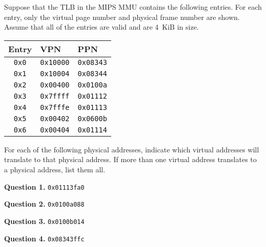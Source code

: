 \documentclass[letterpaper,twocolumn,10pt]{article}
\begin{document}
\pagestyle{fancy}
\fancyfoot[C]{\thepage}

Suppose that the TLB in the MIPS MMU contains the following entries.  For each 
entry, only the virtual page number and physical frame number are shown.  
Assume that all of the entries are valid and are 4~KiB in size.

\begin{table}[h!]
\centering
\begin{tabular}{c|l|l}
\toprule
Entry & VPN & PPN \\
\midrule
    {\tt 0x0}  & {\tt 0x10000}  & {\tt 0x08343} \\
    {\tt 0x1}  & {\tt 0x10004}  & {\tt 0x08344} \\
    {\tt 0x2}  & {\tt 0x00400}  & {\tt 0x0100a} \\
    {\tt 0x3}  & {\tt 0x7ffff}  & {\tt 0x01112} \\
    {\tt 0x4}  & {\tt 0x7fffe}  & {\tt 0x01113} \\
    {\tt 0x5}  & {\tt 0x00402}  & {\tt 0x0600b} \\
    {\tt 0x6}  & {\tt 0x00404}  & {\tt 0x01114} \\
\bottomrule
\end{tabular}
\end{table}

For each of the following physical addresses, indicate which virtual addresses 
will translate to that physical address.  If more than one virtual address 
translates to a physical address, list them all.

\vspace{1em}

\noindent
\textbf{Question 1.} {\tt 0x01113fa0}

\vspace{16em}

\noindent
\textbf{Question 2.} {\tt 0x0100a088}

\vspace{16em}
\break

\textbf{Question 3.} {\tt 0x0100b014}

\vspace{16em}

\textbf{Question 4.} {\tt 0x08343ffc}
\end{document}
